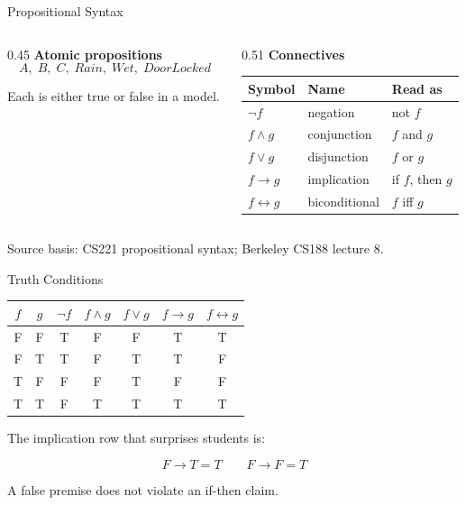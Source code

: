 \documentclass[aspectratio=169,11pt]{beamer}
\newcommand{\minihead}[1]{\textbf{\color{unswblue}#1}}
\newcommand{\source}[1]{\vfill{\scriptsize\color{darkgrey}Source basis: #1}}
\begin{document}
\begin{frame}{Propositional Syntax}
  \begin{columns}[T,onlytextwidth]
    \begin{column}{0.45\textwidth}
      \minihead{Atomic propositions}
      \[
        A,\; B,\; C,\; Rain,\; Wet,\; DoorLocked
      \]

      Each is either true or false in a model.
    \end{column}
    \begin{column}{0.51\textwidth}
      \minihead{Connectives}
      \begin{tabular}{lll}
        \toprule
        Symbol & Name & Read as \\
        \midrule
        $\neg f$ & negation & not $f$ \\
        $f \land g$ & conjunction & $f$ and $g$ \\
        $f \lor g$ & disjunction & $f$ or $g$ \\
        $f \rightarrow g$ & implication & if $f$, then $g$ \\
        $f \leftrightarrow g$ & biconditional & $f$ iff $g$ \\
        \bottomrule
      \end{tabular}
    \end{column}
  \end{columns}

  \source{CS221 propositional syntax; Berkeley CS188 lecture 8.}
\end{frame}

\begin{frame}{Truth Conditions}
  \small
  \begin{center}
    \begin{tabular}{cc|ccccc}
      \toprule
      $f$ & $g$ & $\neg f$ & $f \land g$ & $f \lor g$ & $f \rightarrow g$ & $f \leftrightarrow g$ \\
      \midrule
      F & F & T & F & F & T & T \\
      F & T & T & F & T & T & F \\
      T & F & F & F & T & F & F \\
      T & T & F & T & T & T & T \\
      \bottomrule
    \end{tabular}
  \end{center}

  \vspace{0.8em}
  The implication row that surprises students is:

  \[
    F \rightarrow T = T
    \qquad
    F \rightarrow F = T
  \]

  A false premise does not violate an if-then claim.
\end{frame}
\end{document}

